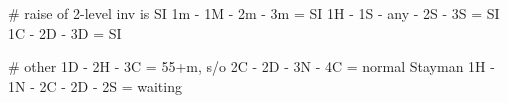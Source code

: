 # raise of 2-level inv is SI
1m - 1M - 2m - 3m = SI
1H - 1S - any - 2S - 3S = SI
1C - 2D - 3D = SI

# other
1D - 2H - 3C = 55+m, s/o
2C - 2D - 3N - 4C = normal Stayman
1H - 1N - 2C - 2D - 2S = waiting